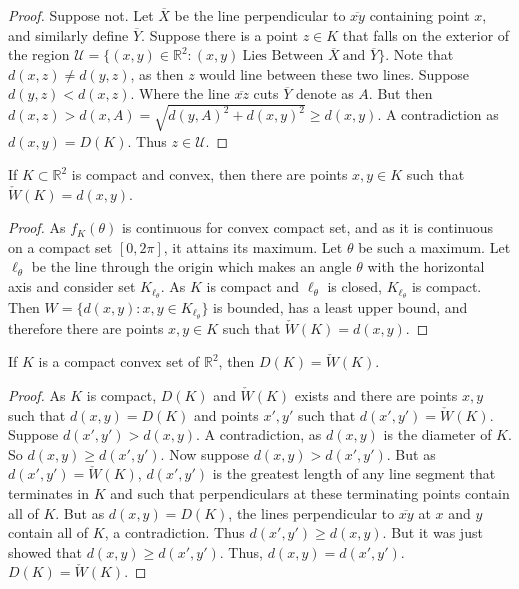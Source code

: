 \documentclass[crop=false,class=article,oneside]{standalone}
\begin{document}
        \begin{proof}
        Suppose not. Let $\overline{X}$ be the line perpendicular to $\overline{xy}$ containing point $x$, and similarly define $\overline{Y}$. Suppose there is a point $z\in K$ that falls on the exterior of the region $\mathcal{U} = \{(x,y)\in \mathbb{R}^2: (x,y)\ \textrm{Lies Between } \overline{X}\ \textrm{and } \overline{Y}\}$. Note that $d(x,z)\ne d(y,z)$, as then $z$ would line between these two lines. Suppose $d(y,z)<d(x,z)$. Where the line $\overline{xz}$ cuts $\overline{Y}$ denote as $A$. But then $d(x,z) > d(x,A) = \sqrt{d(y,A)^2+d(x,y)^2}\geq d(x,y)$. A contradiction as $d(x,y) = D(K)$. Thus $z\in \mathcal{U}$.
        \end{proof}
        \begin{theorem}
        If $K\subset \mathbb{R}^2$ is compact and convex, then there are points $x,y\in K$ such that $\check{W}(K)=d(x,y)$.
        \end{theorem}
        \begin{proof}
        As $f_K(\theta)$ is continuous for convex compact set, and as it is continuous on a compact set $[0,2\pi]$, it attains its maximum. Let $\theta$ be such a maximum. Let $\ell_{\theta}$ be the line through the origin which makes an angle $\theta$ with the horizontal axis and consider set $K_{\ell_{\theta}}$. As $K$ is compact and $\ell_{\theta}$ is closed, $K_{\ell_{\theta}}$ is compact. Then $W=\{d(x,y):x,y\in K_{\ell_{\theta}}\}$ is bounded, has a least upper bound, and therefore there are points $x,y \in K$ such that $\check{W}(K)=d(x,y)$.
        \end{proof}
        \begin{theorem}
        If $K$ is a compact convex set of $\mathbb{R}^2$, then $D(K) = \check{W}(K)$.
        \end{theorem}
        \begin{proof}
        As $K$ is compact, $D(K)$ and $\check{W}(K)$ exists and there are points $x,y$ such that $d(x,y) = D(K)$ and points $x',y'$ such that $d(x',y') = \check{W}(K)$. Suppose $d(x',y')> d(x,y)$. A contradiction, as $d(x,y)$ is the diameter of $K$. So $d(x,y) \geq d(x',y')$. Now suppose $d(x,y)>d(x',y')$. But as $d(x',y')= \check{W}(K)$, $d(x',y')$ is the greatest length of any line segment that terminates in $K$ and such that perpendiculars at these terminating points contain all of $K$. But as $d(x,y)=D(K)$, the lines perpendicular to $\overline{xy}$ at $x$ and $y$ contain all of $K$, a contradiction. Thus $d(x',y') \geq d(x,y)$. But it was just showed that $d(x,y)\geq d(x',y')$. Thus, $d(x,y) = d(x',y')$. $D(K) = \check{W}(K)$.
        \end{proof}
\end{document}
